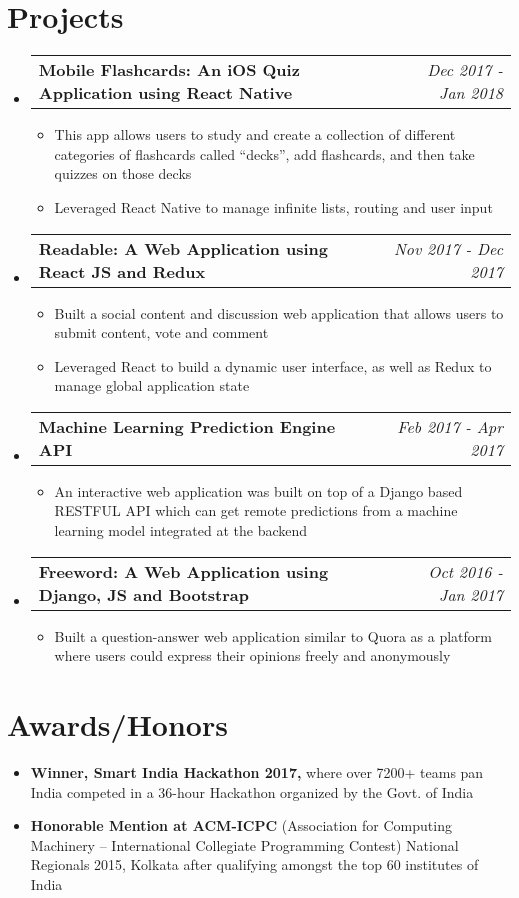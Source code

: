 \documentclass[letterpaper,11pt]{article}
\makeatletter
\newcommand{\resumeItemi}[2]{
  \item\small{
    \textbf{#1}{#2 \vspace{-2pt}}
  }
}
\newcommand{\resumeSubheadingi}[2]{
  \vspace{-1pt}\item
    \begin{tabular*}{0.9835\textwidth}{l@{\extracolsep{\fill}}r}
      \textbf{#1} & \textit{\small #2} \\
    \end{tabular*}\vspace{-5pt}
}
\newcommand{\resumeSubHeadingListStart}{\begin{itemize}[leftmargin=*]}
\newcommand{\resumeSubHeadingListEnd}{\end{itemize}}
\newcommand{\resumeItemListStart}{\begin{itemize}}
\newcommand{\resumeItemListEnd}{\end{itemize}\vspace{-5pt}}
\makeatother
\begin{document}
\section{Projects}
  \resumeSubHeadingListStart
    \itemsep0.35em
    \resumeSubheadingi
        {Mobile Flashcards: An iOS Quiz Application using React Native}{Dec 2017 - Jan 2018}
        \resumeItemListStart
          \resumeItemi{}
            {This app allows users to study and create a collection of different categories of flashcards called “decks”, add flashcards, and then take quizzes on those decks}
          \resumeItemi{}
            {Leveraged React Native to manage infinite lists, routing and user input}
        \resumeItemListEnd
    \resumeSubheadingi
        {Readable: A Web Application using React JS and Redux}{Nov 2017 - Dec 2017}
        \resumeItemListStart
          \resumeItemi{}
            {Built a social content and discussion web application that allows users to submit content, vote and comment}
          \resumeItemi{}
            {Leveraged React to build a dynamic user interface, as well as Redux to manage global application state}
        \resumeItemListEnd
    \resumeSubheadingi
        {Machine Learning Prediction Engine API}{Feb 2017 - Apr 2017}
        \resumeItemListStart
          \resumeItemi{}
            {An interactive web application was built on top of a Django based RESTFUL API which can get remote predictions from a machine learning model integrated at the backend}
        \resumeItemListEnd
    \resumeSubheadingi
        {Freeword: A Web Application using Django, JS and Bootstrap}{Oct 2016 - Jan 2017}
        \resumeItemListStart
          \resumeItemi{}
            {Built a question-answer web application similar to Quora as a platform where users could express their opinions freely and anonymously}
        \resumeItemListEnd
  \resumeSubHeadingListEnd

%

\section{Awards/Honors}
  \resumeSubHeadingListStart
    \itemsep0em
    \item{
      \textbf{Winner, Smart India Hackathon 2017,}{ where over 7200+ teams pan India competed in a 36-hour Hackathon organized by the Govt. of India}
    }
    \item{
      \textbf{Honorable Mention at ACM-ICPC}{ (Association for Computing Machinery – International Collegiate Programming Contest) National Regionals 2015, Kolkata after qualifying amongst the top 60 institutes of India}
    }
  \resumeSubHeadingListEnd


\end{document}
